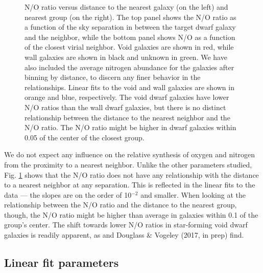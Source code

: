 \begin{figure}
    \caption[N/O versus distance to nearest neighbor and group]{N/O ratio versus 
    distance to the nearest galaxy (on the left) and nearest group (on the 
    right).  The top panel shows the N/O ratio as a function of the sky 
    separation in \hMpc between the target dwarf galaxy and the neighbor, while 
    the bottom panel shows N/O as a function of the closest virial neighbor.  
    Void galaxies are shown in red, while wall galaxies are shown in black and 
    unknown in green.  We have also included the average nitrogen abundance for 
    the galaxies after binning by distance, to discern any finer behavior in the 
    relationships.  Linear fits to the void and wall galaxies are shown in 
    orange and blue, respectively.  The void dwarf galaxies have lower N/O 
    ratios than the wall dwarf galaxies, but there is no distinct relationship 
    between the distance to the nearest neighbor and the N/O ratio.  The N/O 
    ratio might be higher in dwarf galaxies within 0.05 \hMpc of the center of 
    the closest group.}
    \label{fig:NO}
\end{figure}

We do not expect any influence on the relative synthesis of oxygen and nitrogen 
from the proximity to a nearest neighbor.  Unlike the other parameters studied, 
Fig. \ref{fig:NO} shows that the N/O ratio does not have any relationship with 
the distance to a nearest neighbor at any separation.  This is reflected in the 
linear fits to the data --- the slopes are on the order of 10$^{-2}$ and 
smaller.  When looking at the relationship between the N/O ratio and the 
distance to the nearest group, though, the N/O ratio might be higher than 
average in galaxies within 0.1 \hMpc of the group's center.  The shift towards 
lower N/O ratios in star-forming void dwarf galaxies is readily apparent, as 
\cite{Douglass17b} and Douglass \& Vogeley (2017, in prep) find.


\subsection{Linear fit parameters}


